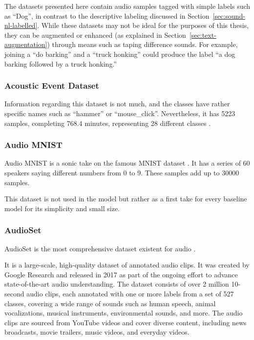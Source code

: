 The datasets presented here contain audio samples tagged with simple labels such as ``Dog'', in contrast to the descriptive labeling discussed in Section~\ref{sec:sound-nl-labelled}. While these datasets may not be ideal for the purposes of this thesis, they can be augmented or enhanced (as explained in Section~\ref{sec:text-augmentation}) through means such as taping difference sounds. For example, joining a ``do barking'' and a ``truck honking'' could produce the label ``a dog barking followed by a truck honking.''


\subsubsection{Acoustic Event Dataset}

Information regarding this dataset is not much, and the classes have rather specific names such as ``hammer'' or ``mouse\_click''. Nevertheless, it has 5223 samples, completing 768.4 minutes, representing 28 different classes \cite{takahashi_deep_2016}.

\subsubsection{Audio MNIST} \label{sec:dataset-amnist}

Audio MNIST \cite{becker_interpreting_2018} is a sonic take on the famous MNIST dataset \cite{deng_mnist_2012}. It has a series of 60 speakers saying different numbers from 0 to 9. These samples add up to 30000 samples.

This dataset is not used in the model but rather as a first take for every baseline model for its simplicity and small size.

\subsubsection{AudioSet}

AudioSet is the most comprehensive dataset existent for audio \cite{gemmeke_audio_2017}.

It is a large-scale, high-quality dataset of annotated audio clips. It was created by Google Research and released in 2017 as part of the ongoing effort to advance state-of-the-art audio understanding.
The dataset consists of over 2 million 10-second audio clips, each annotated with one or more labels from a set of 527 classes, covering a wide range of sounds such as human speech, animal vocalizations, musical instruments, environmental sounds, and more. The audio clips are sourced from YouTube videos and cover diverse content, including news broadcasts, movie trailers, music videos, and everyday videos.

